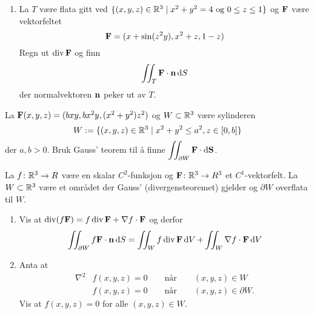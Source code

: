 

\oppgave[V2017, Oppgave 5]

\begin{enumerate}
  \item La $T$ være flata gitt ved $\{(x,y,z) \in \mathbb{R}^3 \mid x^2 + y^2 = 4
    \ \text{og} \ 0 \leq z \leq 1\}$ og $\mathbf{F}$ være vektorfeltet
    \begin{equation*}
      \mathbf{F} = (x + \sin(z^2y), x^2 + z, 1 - z)
    \end{equation*}
    Regn ut $\operatorname{div} \mathbf{F}$ og finn
    \begin{equation*}
      \iint_T \mathbf{F} \cdot \mathbf{n} \mathop{}\! \mathrm{d} S\mathop{}\! 
    \end{equation*}
    der normalvektoren $\mathbf{n}$ peker ut av $T$.
\end{enumerate}

\oppgave[K2016, Oppgave 7] La $\mathbf{F}(x,y,z) = (bxy, bx^2y, (x^2 + y^2)z^2)$ og
$W \subset \mathbb{R}^3$ være sylinderen
%
\begin{equation*}
  W := \{  (x,y,z) \in \mathbb{R}^3 \mid x^2 + y^2 \leq a^2, z \in [0, b]\}
\end{equation*}
%
der $a, b > 0$. Bruk Gauss' teorem til å finne $\displaystyle \iint_{\partial W} \mathbf{F} \cdot
\mathop{}\! \mathrm{d} \mathbf{S}\mathop{}\!$.

\oppgave[V2016, Oppgave 7] La $f \colon \mathbb{R}^3 \to R$ være en skalar
$C^2$-funksjon og $\mathbf{F} \colon \mathbb{R}^3 \to R^3$ et $C^1$-vektorfelt. La $W
\subset \mathbb{R}^3$ være et området der Gauss' (divergensteoremet) gjelder og
$\partial W$ overflata til $W$.

\begin{enumerate}
    \item Vis at $\operatorname{div}(f \mathbf{F}) = f \operatorname{div} \mathbf{F} + \nabla f \cdot \mathbf{F}$ og derfor
    \begin{equation*}
      \iint_{\partial W} f \mathbf{F} \cdot \mathbf{n} \mathop{}\! \mathrm{d} S\mathop{}\!
      = \iint_{W} f \operatorname{div} \mathbf{F} \mathop{}\! \mathrm{d} V\mathop{}\!
      + \iint_{W} \nabla f \cdot \mathbf{F} \mathop{}\! \mathrm{d} V\mathop{}\! 
    \end{equation*}
  \item Anta at
    \begin{align*}
      \nabla^2 & f(x,y,z) = 0 \qquad \text{når} \qquad (x,y,z) \in W  \\
               & f(x,y,z) = 0 \qquad \text{når} \qquad (x,y,z) \in \partial W. 
    \end{align*}
    Vis at $f(x,y,z) = 0$ for alle $(x,y,z) \in W$. 
\end{enumerate}

